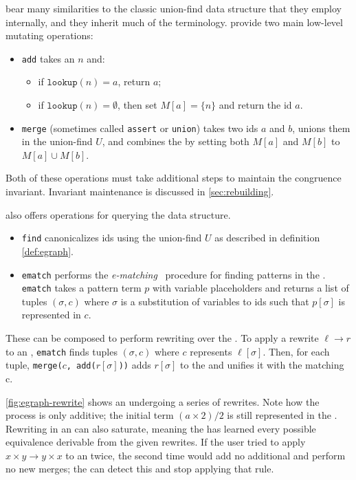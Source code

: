 \Egraphs bear many similarities to the classic union-find data
  structure that they employ internally,
  and they inherit much of the terminology.
\Egraphs provide two main low-level mutating operations:
\begin{itemize}
    \item \texttt{add} takes an \enode $n$ and:
    \begin{itemize}
        \item if $\texttt{lookup}(n) = a$, return $a$;
        \item if $\texttt{lookup}(n) = \emptyset$,
              then set $M[a] = \{ n \}$ and return the id $a$.
    \end{itemize}
    \item \texttt{merge} (sometimes called \texttt{assert} or \texttt{union})
    takes two \eclass ids $a$ and $b$,
    unions them in the union-find $U$,
    and combines the \eclasses by setting both $M[a]$ and $M[b]$ to $M[a] \cup M[b]$.
\end{itemize}

Both of these operations must take additional steps to maintain the congruence
  invariant.
Invariant maintenance is discussed in \autoref{sec:rebuilding}.

\Egraphs also offers operations for querying the data structure.
\begin{itemize}
    \item \texttt{find} canonicalizes \eclass ids using the union-find $U$ as described in definition \ref{def:egraph}.
    \item \texttt{ematch} performs the
          \textit{e-matching}~\cite{simplify, ematching}
          procedure for finding patterns in the \egraph.
          \texttt{ematch} takes a pattern term $p$ with variable placeholders
          and returns a list of tuples $(\sigma, c)$ where $\sigma$ is a substitution of
          variables to \eclass ids such that $p[\sigma]$ is represented in \eclass $c$.
\end{itemize}
These can be composed to perform rewriting over the
  \egraph.
To apply a rewrite $\ell \to r$ to an \egraph,
  \texttt{ematch}
  finds tuples $(\sigma, c)$ where \eclass $c$ represents $\ell[\sigma]$.
Then, for each tuple,
  \mbox{\texttt{merge($c$, add($r[\sigma]$))}} adds $r[\sigma]$ to the \egraph
  and unifies it with the matching \eclass c.

\autoref{fig:egraph-rewrite} shows an \egraph undergoing a series of rewrites.
Note how the process is only additive; the initial term $(a \times 2) / 2$ is
  still represented in the \egraph.
Rewriting in an \egraph can also saturate, meaning the \egraph has
  learned every possible equivalence derivable from the given rewrites.
If the user tried to apply $x \times y \to y \times x$ to an \egraph twice,
  the second time would add no additional \enodes and perform no new merges;
  the \egraph can detect this and stop applying that rule.

